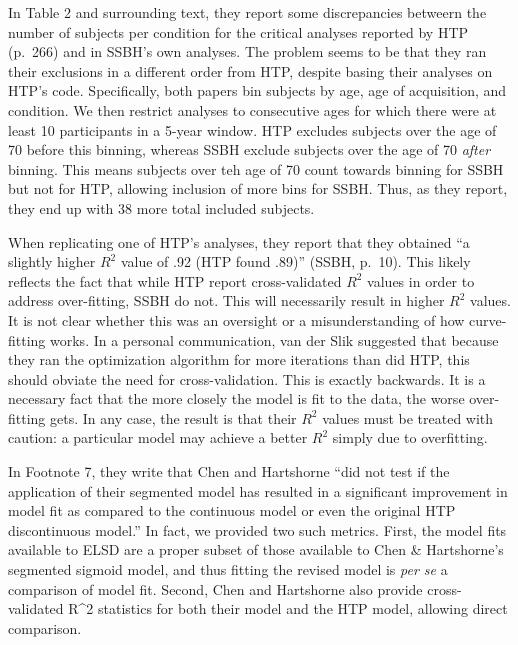 \documentclass[
  english,
  doc,floatsintext]{apa6}
\begin{document}
\begin{appendix}
In Table 2 and surrounding text, they report some discrepancies betweern
the number of subjects per condition for the critical analyses reported
by HTP (p.~266) and in SSBH's own analyses. The problem seems to be that
they ran their exclusions in a different order from HTP, despite basing
their analyses on HTP's code. Specifically, both papers bin subjects by
age, age of acquisition, and condition. We then restrict analyses to
consecutive ages for which there were at least 10 participants in a
5-year window. HTP excludes subjects over the age of 70 before this
binning, whereas SSBH exclude subjects over the age of 70 \emph{after}
binning. This means subjects over teh age of 70 count towards binning
for SSBH but not for HTP, allowing inclusion of more bins for SSBH.
Thus, as they report, they end up with 38 more total included subjects.

When replicating one of HTP's analyses, they report that they obtained
``a slightly higher \(R^2\) value of .92 (HTP found .89)'' (SSBH,
p.~10). This likely reflects the fact that while HTP report
cross-validated \(R^2\) values in order to address over-fitting, SSBH do
not. This will necessarily result in higher \(R^2\) values. It is not
clear whether this was an oversight or a misunderstanding of how
curve-fitting works. In a personal communication, van der Slik suggested
that because they ran the optimization algorithm for more iterations
than did HTP, this should obviate the need for cross-validation. This is
exactly backwards. It is a necessary fact that the more closely the
model is fit to the data, the worse over-fitting gets. In any case, the
result is that their \(R^2\) values must be treated with caution: a
particular model may achieve a better \(R^2\) simply due to overfitting.

In Footnote 7, they write that Chen and Hartshorne ``did not test if the
application of their segmented model has resulted in a significant
improvement in model fit as compared to the continuous model or even the
original HTP discontinuous model.'' In fact, we provided two such
metrics. First, the model fits available to ELSD are a proper subset of
those available to Chen \& Hartshorne's segmented sigmoid model, and
thus fitting the revised model is \emph{per se} a comparison of model
fit. Second, Chen and Hartshorne also provide cross-validated R\^{}2
statistics for both their model and the HTP model, allowing direct
comparison.
\end{appendix}
\end{document}

